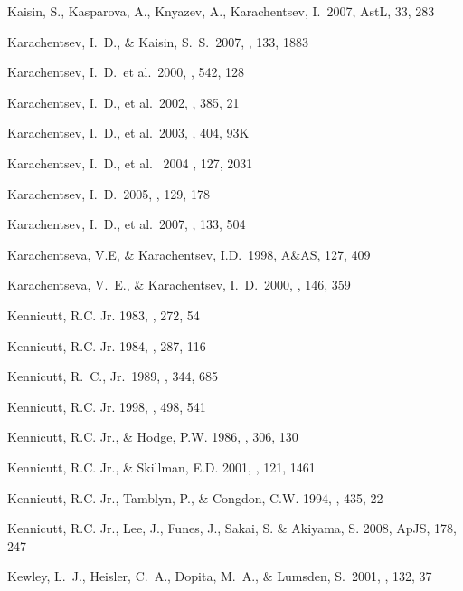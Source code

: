 \documentclass[12pt,preprint]{emulateapj}
\begin{document}
\begin{thebibliography}{}
Kaisin, S., Kasparova, A., Knyazev, A., Karachentsev, I.\ 2007, AstL, 33, 283 

Karachentsev, I.~D., \& Kaisin, S.~S.\ 2007, \aj, 133, 1883 

Karachentsev, I.~D.~et al.\ 2000, \apj, 542, 128 

Karachentsev, I.~D., et al.\ 2002, \aap, 385, 21

Karachentsev, I.~D., et al.\ 2003, \aap, 404, 93K 

Karachentsev, I.~D., et al. \ 2004 \aj, 127, 2031

Karachentsev, I.~D.\ 2005, \aj, 129, 178 

Karachentsev, I.~D., et al.\ 2007, \aj, 133, 504 

Karachentseva, V.E, \& Karachentsev, I.D.\ 1998, A\&AS, 127, 409 

Karachentseva, V.~E., \& Karachentsev, I.~D.\ 2000, \aaps, 146, 359 

Kennicutt, R.C. Jr. 1983, \apj , 272, 54

Kennicutt, R.C. Jr. 1984, \apj , 287, 116

Kennicutt, R.~C., Jr.\ 1989, \apj, 344, 685 

Kennicutt, R.C. Jr. 1998, \apj , 498, 541

Kennicutt, R.C. Jr., \& Hodge, P.W. 1986, \apj , 306, 130

Kennicutt, R.C. Jr., \& Skillman, E.D. 2001, \aj , 121, 1461 

Kennicutt, R.C. Jr., Tamblyn, P., \& Congdon, C.W. 1994, \apj , 435, 22

Kennicutt, R.C. Jr., Lee, J., Funes, J., Sakai, S. \& Akiyama, S. 2008, ApJS, 178, 247

Kewley, L.~J., Heisler, C.~A., Dopita, M.~A., \& Lumsden, S.\ 2001, \apjs, 132, 37 


\end{thebibliography}
\end{document}
